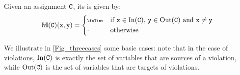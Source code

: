 \begin{definition}[Assignment]
    Given an assignment \(\mathtt{C}\), its \SFM is given by:
    \[
        \sfm{C}(\textnormal{\prc|x|},\textnormal{\prc|y|})=
        \begin{dcases*}
            \vi &  if $\textnormal{\prc|x|} \in \In(\comm{C})$, $\textnormal{\prc|y|} \in \Out(\comm{C})$ and $\comm{x} \neq \comm{y}$\\
            \nv & otherwise
        \end{dcases*}
    \]
\end{definition}

We illustrate in \autoref{Fig_threecases} some basic cases: %
note that in the case of violations, $\operatorname{In}(\mathtt{C})$ is exactly the set of variables that are sources of a violation,
while $\operatorname{Out}(\mathtt{C})$ is the set of variables that are targets of violations.

